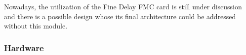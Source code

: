 Nowadays, the utilization of the Fine Delay FMC card is still under discussion and there is a possible design whose its final architecture could be addressed without this module.

\subsubsection{Hardware}
\label{subsec:hardware}

%
%


